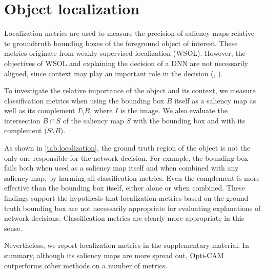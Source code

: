 \section{Object localization}
\label{sec:oc_loc}
Localization metrics are used to measure the precision of saliency maps relative to groundtruth 
bounding boxes of the foreground object of interest. These metrics originate from weakly supervised 
localization (WSOL). However, the objectives of WSOL and explaining the decision of a DNN are not 
necessarily aligned, since context may play an important role in the decision (\cite{shetty2019not}, 
\cite{rao2022towards}).

To investigate the relative importance of the object and its context, we measure classification 
metrics when using the bounding box $B$ itself as a saliency map as well as its complement 
$I \setminus B$, where $I$ is the image. We also evaluate the intersection $B \cap S$ of the 
saliency map $S$ with the bounding box and with its complement ($S \setminus B$).

As shown in \autoref{tab:localization}, the ground truth region of the object is not the only one 
responsible for the network decision. For example, the bounding box fails both when used as a 
saliency map itself and when combined with any saliency map, by harming all classification metrics. 
Even the complement is more effective than the bounding box itself, either alone or when combined. 
These findings support the hypothesis that localization metrics based on the ground truth bounding 
box are not necessarily appropriate for evaluating explanations of network decisions. 
Classification metrics are clearly more appropriate in this sense.

Nevertheless, we report localization metrics in the supplementary material. In summary, although 
its saliency maps are more spread out, Opti-CAM outperforms other methods on a number of metrics.




